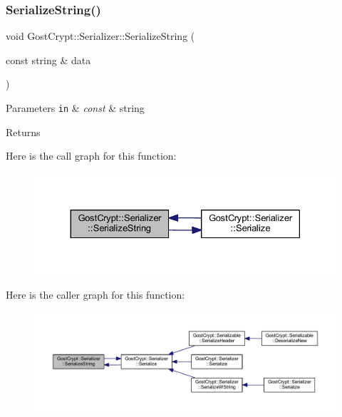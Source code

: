 \subsubsection{\texorpdfstring{Serialize\+String()}{SerializeString()}}
{\footnotesize\ttfamily void Gost\+Crypt\+::\+Serializer\+::\+Serialize\+String (\begin{DoxyParamCaption}\item[{const string \&}]{data }\end{DoxyParamCaption})\hspace{0.3cm}{\ttfamily [protected]}}


\begin{DoxyParams}[1]{Parameters}
\mbox{\tt in}  & {\em const} & string \\
\hline
\end{DoxyParams}
\begin{DoxyReturn}{Returns}

\end{DoxyReturn}
Here is the call graph for this function\+:
\nopagebreak
\begin{figure}[H]
\begin{center}
\leavevmode
\includegraphics[width=330pt]{class_gost_crypt_1_1_serializer_a0ff9e46389512da69d19ca7bb27b5993_cgraph}
\end{center}
\end{figure}
Here is the caller graph for this function\+:
\nopagebreak
\begin{figure}[H]
\begin{center}
\leavevmode
\includegraphics[width=350pt]{class_gost_crypt_1_1_serializer_a0ff9e46389512da69d19ca7bb27b5993_icgraph}
\end{center}
\end{figure}
\mbox{\label{class_gost_crypt_1_1_serializer_aea0bc16b69e4df001a1477d9808bdc07}} 
